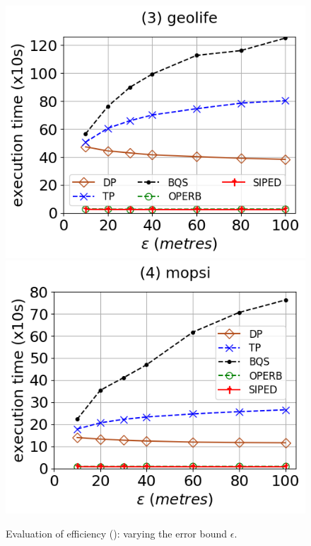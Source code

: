\begin{figure}[tb!]
	\includegraphics[scale=0.315]{Figures/Exp-PED-time-epsilon-geolife.png}	\hspace{1ex}
	\includegraphics[scale=0.315]{Figures/Exp-PED-time-epsilon-mopsi.png}	\hspace{1ex}
	\vspace{-2.5ex}
	\caption{\small Evaluation of efficiency (\ped): varying the error bound $\epsilon$.}\label{fig:time-epsilon-ped}
	\vspace{-2ex}
\end{figure}

